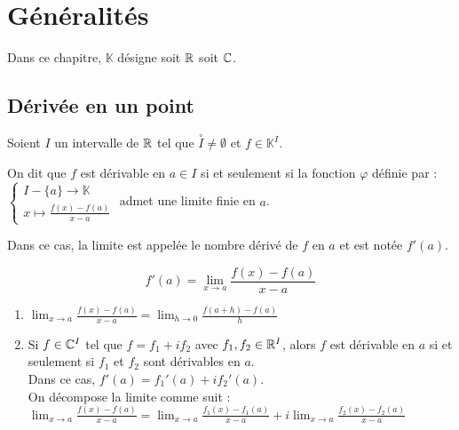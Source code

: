 \documentclass[12pt, a4paper]{report}
\begin{document}

\tableofcontents
\clearpage

\chapter{Généralités}

\begin{importantbox}
    Dans ce chapitre, $\mathbb{K}$ désigne soit $\mathbb{R}$ soit $\mathbb{C}$.
\end{importantbox}

\section{Dérivée en un point}

\begin{definition}
    Soient $I$ un intervalle de $\mathbb{R}$ tel que $\overset{\circ}{I}\neq\emptyset$ et $f\in\mathbb{K}^I$.

    On dit que $f$ est dérivable en $a \in I$ si et seulement si la fonction $\varphi$ définie par : $\begin{cases}I-\{a\}\to\mathbb{K}\\x\mapsto \frac{f(x)-f(a)}{x-a}\end{cases}$ admet une limite finie en $a$.

    Dans ce cas, la limite est appelée le nombre dérivé de $f$ en $a$ et est notée $f'(a)$.

    $$f'(a) = \lim_{x\to a} \frac{f(x)-f(a)}{x-a}$$
\end{definition}

\begin{remark}
    \begin{enumerate}
        \item $\lim_{x\to a} \frac{f(x)-f(a)}{x-a} = \lim_{h\to 0} \frac{f(a+h)-f(a)}{h}$
        \item Si $f \in \mathbb{C}^I$ tel que $f = f_1+if_2$ avec $f_1, f_2 \in \mathbb{R}^I$, alors $f$ est dérivable en $a$ si et seulement si $f_1$ et $f_2$ sont dérivables en $a$.\\Dans ce cas, $f'(a) = f_1'(a) + if_2'(a)$.\\On décompose la limite comme suit : $\lim_{x\to a} \frac{f(x)-f(a)}{x-a} = \lim_{x\to a} \frac{f_1(x)-f_1(a)}{x-a} + i\lim_{x\to a} \frac{f_2(x)-f_2(a)}{x-a}$
    \end{enumerate}
\end{remark}
\end{document}
